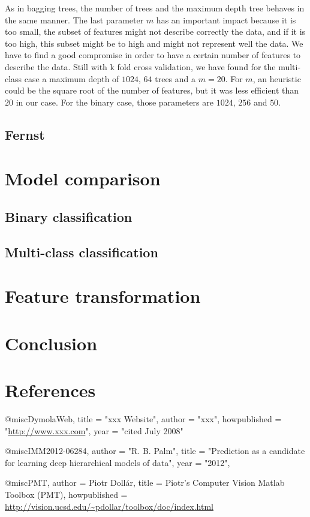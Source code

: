 \documentclass{article} %
\begin{document}
As in bagging trees, the number of trees and the maximum depth tree behaves in the same manner. The last parameter $m$ has an important impact because it is too small, the subset of features might not describe correctly the data, and if it is too high, this subset might be to high and might not represent well the data. We have to find a good compromise in order to have a certain number of features to describe the data. Still with k fold cross validation, we have found for the multi-class case a maximum depth of $1024$,  $64$ trees and a $m = 20$. For $m$, an heuristic could be the square root of the number of features, but it was less efficient than $20$ in our case. For the binary case, those parameters are $1024$, $256$ and $50$.

\subsection{Fernst}

\section{Model comparison}

\subsection{Binary classification}

\subsection{Multi-class classification}

\section{Feature transformation}

\section{Conclusion}

\section{References}

@misc{DymolaWeb,
  title = "xxx Website",
  author = "xxx",
  howpublished = "\url{http://www.xxx.com}",
  year = "cited July 2008"
}

@misc{IMM2012-06284,
    author       = "R. B. Palm",
    title        = "Prediction as a candidate for learning deep hierarchical models of data",
    year         = "2012",
}

@misc{PMT,
   author = {Piotr Doll\'ar}, 
   title = {{P}iotr's {C}omputer {V}ision {M}atlab {T}oolbox ({PMT})}, 
   howpublished = {\url{http://vision.ucsd.edu/~pdollar/toolbox/doc/index.html}} 
} 
\end{document}
